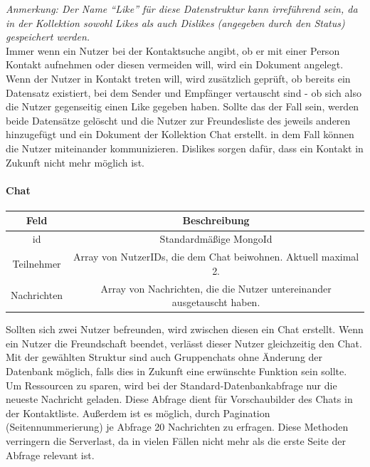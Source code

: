 \textit{Anmerkung: Der Name \enquote{Like} für diese Datenstruktur kann irreführend sein, da in der Kollektion sowohl Likes als auch Dislikes (angegeben durch den Status) gespeichert werden.\\}
Immer wenn ein Nutzer bei der Kontaktsuche angibt, ob er mit einer Person Kontakt aufnehmen oder diesen vermeiden will, wird ein Dokument angelegt. Wenn der Nutzer in Kontakt treten will, wird zusätzlich geprüft, ob bereits ein Datensatz existiert, bei dem Sender und Empfänger vertauscht sind - ob sich also die Nutzer gegenseitig einen Like gegeben haben. Sollte das der Fall sein, werden beide Datensätze gelöscht und die Nutzer zur Freundesliste des jeweils anderen hinzugefügt und ein Dokument der Kollektion Chat erstellt. in dem Fall können die Nutzer miteinander kommunizieren. Dislikes sorgen dafür, dass ein Kontakt in Zukunft nicht mehr möglich ist.

\paragraph{Chat\\}
\begin{center}
    \begin{tabular}{ |c|c| }
        \hline
        Feld & Beschreibung  \\
        \hline
        id & Standardmäßige MongoId \\
        Teilnehmer & Array von NutzerIDs, die dem Chat beiwohnen. Aktuell maximal 2. \\
        Nachrichten & Array von Nachrichten, die die Nutzer untereinander ausgetauscht haben. \\
        \hline
    \end{tabular}
\end{center}
Sollten sich zwei Nutzer befreunden, wird zwischen diesen ein Chat erstellt. Wenn ein Nutzer die Freundschaft beendet, verlässt dieser Nutzer gleichzeitig den Chat. Mit der gewählten Struktur sind auch Gruppenchats ohne Änderung der Datenbank möglich, falls dies in Zukunft eine erwünschte Funktion sein sollte.\\
Um Ressourcen zu sparen, wird bei der Standard-Datenbankabfrage nur die neueste Nachricht geladen. Diese Abfrage dient für Vorschaubilder des Chats in der Kontaktliste. Außerdem ist es möglich, durch Pagination (Seitennummerierung) je Abfrage 20 Nachrichten zu erfragen. Diese Methoden verringern die Serverlast, da in vielen Fällen nicht mehr als die erste Seite der Abfrage relevant ist.\\

